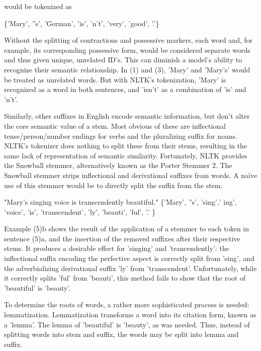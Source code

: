 \documentclass[11pt,twocolumn]{article}
\begin{document}
would be tokenized as
\begin{exe}
		\ex \{'Mary', ''s', 'German', 'is', 'n't', 'very', 'good', '.'\}
\end{exe}
Without the splitting of contractions and possessive markers, each word and, for example, its corresponding possessive form, would be considered separate words and thus given unique, unrelated ID's. This can diminish a model's ability to recognize their semantic relationship. In (1) and (3), 'Mary' and 'Mary's' would be treated as unrelated words. But with NLTK's tokenization, 'Mary' is recognized as a word in both sentences, and 'isn't' as a combination of 'is' and 'n't'.
\par Similarly, other suffixes in English encode semantic information, but don't alter the core semantic value of a stem. Most obvious of these are inflectional tense/person/number endings for verbs and the pluralizing suffix for nouns. NLTK's tokenizer does nothing to split these from their stems, resulting in the same lack of representation of semantic similarity. Fortunately, NLTK provides the Snowball stemmer, alternatively known as the Porter Stemmer 2. The Snowball stemmer strips inflectional and derivational suffixes from words. A naïve use of this stemmer would be to directly split the suffix from the stem. 
\begin{exe}
		\ex
			\begin{xlist}
				\ex "Mary's singing voice is transcendently beautiful."
				\ex \{'Mary', ''s', 'sing',' ing', 'voice', 'is', 'transcendent', 'ly', 'beauti', 'ful', '.' \}
			\end{xlist}
\end{exe}
Example (5)b shows the result of the application of a stemmer to each token in sentence (5)a, and the insertion of the removed suffixes after their respective stems. It produces a desirable effect for 'singing' and 'trancendently': the inflectional suffix encoding the perfective aspect is correctly split from 'sing', and the adverbializing derivational suffix 'ly' from 'transcendent'. Unfortunately, while it correctly splits 'ful' from 'beauti', this method fails to show that the root of 'beautiful' is 'beauty'.
\par To determine the roots of words, a rather more sophisticated process is needed: lemmatization. Lemmatization transforms a word into its citation form, known as a 'lemma'. The lemma of 'beautiful' is 'beauty', as was needed. Thus, instead of splitting words into stem and suffix, the words may be split into lemma and suffix.
\end{document}
